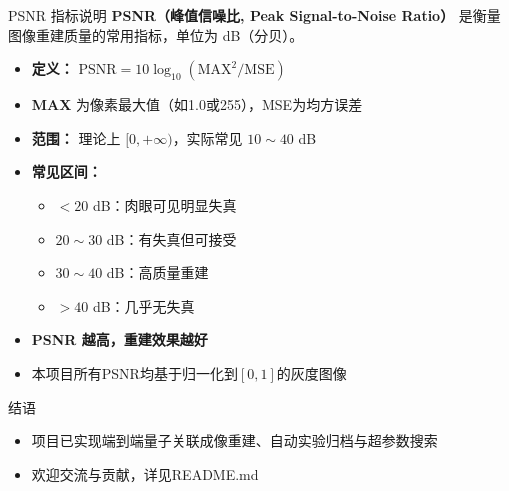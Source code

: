 \documentclass{beamer}
\begin{document}
\begin{frame}{PSNR 指标说明}
    \textbf{PSNR（峰值信噪比, Peak Signal-to-Noise Ratio）} 是衡量图像重建质量的常用指标，单位为 dB（分贝）。
    \begin{itemize}
        \item \textbf{定义：} $\mathrm{PSNR} = 10 \log_{10}(\mathrm{MAX}^2 / \mathrm{MSE})$
        \item \textbf{MAX} 为像素最大值（如1.0或255），MSE为均方误差
        \item \textbf{范围：} 理论上 $[0, +\infty)$，实际常见 $10\sim40$ dB
        \item \textbf{常见区间：}
        \begin{itemize}
            \item $<20$ dB：肉眼可见明显失真
            \item $20\sim30$ dB：有失真但可接受
            \item $30\sim40$ dB：高质量重建
            \item $>40$ dB：几乎无失真
        \end{itemize}
        \item \textbf{PSNR 越高，重建效果越好}
        \item 本项目所有PSNR均基于归一化到$[0,1]$的灰度图像
    \end{itemize}
\end{frame}

\begin{frame}{结语}
\begin{itemize}
    \item 项目已实现端到端量子关联成像重建、自动实验归档与超参数搜索
    \item 欢迎交流与贡献，详见README.md
\end{itemize}
\end{frame}
\end{document}
